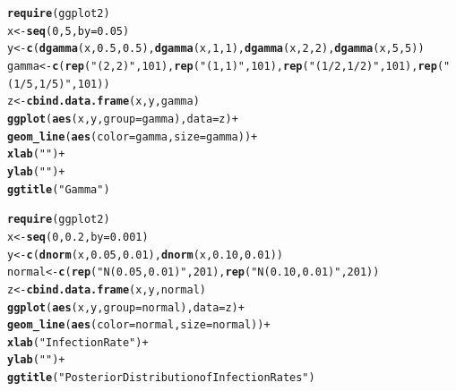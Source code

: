 \documentclass[12pt]{article}\usepackage[]{graphicx}\usepackage[]{color}
\makeatletter
\newcommand{\hlnum}[1]{\textcolor[rgb]{0.686,0.059,0.569}{#1}}%
\newcommand{\hlstr}[1]{\textcolor[rgb]{0.192,0.494,0.8}{#1}}%
\newcommand{\hlopt}[1]{\textcolor[rgb]{0,0,0}{#1}}%
\newcommand{\hlstd}[1]{\textcolor[rgb]{0.345,0.345,0.345}{#1}}%
\newcommand{\hlkwb}[1]{\textcolor[rgb]{0.69,0.353,0.396}{#1}}%
\newcommand{\hlkwc}[1]{\textcolor[rgb]{0.333,0.667,0.333}{#1}}%
\newcommand{\hlkwd}[1]{\textcolor[rgb]{0.737,0.353,0.396}{\textbf{#1}}}%
\newenvironment{kframe}{%
 \def\at@end@of@kframe{}%
 \ifinner\ifhmode%
  \def\at@end@of@kframe{\end{minipage}}%
  \begin{minipage}{\columnwidth}%
 \fi\fi%
 \def\FrameCommand##1{\hskip\@totalleftmargin \hskip-\fboxsep
 \colorbox{shadecolor}{##1}\hskip-\fboxsep
     \hskip-\linewidth \hskip-\@totalleftmargin \hskip\columnwidth}%
 \MakeFramed {\advance\hsize-\width
   \@totalleftmargin\z@ \linewidth\hsize
   \@setminipage}}%
 {\par\unskip\endMakeFramed%
 \at@end@of@kframe}
\newenvironment{knitrout}{}{} %
\makeatother
\begin{document}
\begin{knitrout}\footnotesize
{}\color{fgcolor}\begin{kframe}
\begin{alltt}
\hlkwd{require}\hlstd{(ggplot2)}
\hlstd{x} \hlkwb{<-} \hlkwd{seq}\hlstd{(}\hlnum{0}\hlstd{,}\hlnum{5}\hlstd{,} \hlkwc{by}\hlstd{=}\hlnum{0.05}\hlstd{)}
\hlstd{y} \hlkwb{<-} \hlkwd{c}\hlstd{(}\hlkwd{dgamma}\hlstd{(x,}\hlnum{0.5}\hlstd{,}\hlnum{0.5}\hlstd{),} \hlkwd{dgamma}\hlstd{(x,}\hlnum{1}\hlstd{,}\hlnum{1}\hlstd{),} \hlkwd{dgamma}\hlstd{(x,}\hlnum{2}\hlstd{,}\hlnum{2}\hlstd{),} \hlkwd{dgamma}\hlstd{(x,}\hlnum{5}\hlstd{,}\hlnum{5}\hlstd{))}
\hlstd{gamma} \hlkwb{<-} \hlkwd{c}\hlstd{(}\hlkwd{rep}\hlstd{(}\hlstr{"(2, 2)"}\hlstd{,} \hlnum{101}\hlstd{),} \hlkwd{rep}\hlstd{(}\hlstr{"(1, 1)"}\hlstd{,} \hlnum{101}\hlstd{),} \hlkwd{rep}\hlstd{(}\hlstr{"(1/2, 1/2)"}\hlstd{,} \hlnum{101}\hlstd{),} \hlkwd{rep}\hlstd{(}\hlstr{"(1/5, 1/5)"}\hlstd{,} \hlnum{101}\hlstd{))}
\hlstd{z} \hlkwb{<-} \hlkwd{cbind.data.frame}\hlstd{(x,y, gamma)}
\hlkwd{ggplot}\hlstd{(}\hlkwd{aes}\hlstd{(x, y,} \hlkwc{group}\hlstd{=gamma),} \hlkwc{data}\hlstd{=z)} \hlopt{+}
  \hlkwd{geom_line}\hlstd{(}\hlkwd{aes}\hlstd{(}\hlkwc{color}\hlstd{=gamma,} \hlkwc{size}\hlstd{=gamma))}\hlopt{+}
  \hlkwd{xlab}\hlstd{(}\hlstr{""}\hlstd{)}\hlopt{+}
  \hlkwd{ylab}\hlstd{(}\hlstr{""}\hlstd{)}\hlopt{+}
  \hlkwd{ggtitle}\hlstd{(}\hlstr{"Gamma"}\hlstd{)}
\end{alltt}
\end{kframe}
\end{knitrout}

\begin{knitrout}\footnotesize
{}\color{fgcolor}\begin{kframe}
\begin{alltt}
\hlkwd{require}\hlstd{(ggplot2)}
\hlstd{x} \hlkwb{<-} \hlkwd{seq}\hlstd{(}\hlnum{0}\hlstd{,}\hlnum{0.2}\hlstd{,} \hlkwc{by}\hlstd{=}\hlnum{0.001}\hlstd{)}
\hlstd{y} \hlkwb{<-} \hlkwd{c}\hlstd{(}\hlkwd{dnorm}\hlstd{(x,}\hlnum{0.05}\hlstd{,}\hlnum{0.01}\hlstd{),} \hlkwd{dnorm}\hlstd{(x,} \hlnum{0.10}\hlstd{,} \hlnum{0.01}\hlstd{))}
\hlstd{normal} \hlkwb{<-} \hlkwd{c}\hlstd{(}\hlkwd{rep}\hlstd{(}\hlstr{"N(0.05, 0.01)"}\hlstd{,} \hlnum{201}\hlstd{),} \hlkwd{rep}\hlstd{(}\hlstr{"N(0.10, 0.01)"}\hlstd{,} \hlnum{201}\hlstd{))}
\hlstd{z} \hlkwb{<-} \hlkwd{cbind.data.frame}\hlstd{(x,y, normal)}
\hlkwd{ggplot}\hlstd{(}\hlkwd{aes}\hlstd{(x, y,} \hlkwc{group}\hlstd{=normal),} \hlkwc{data}\hlstd{=z)} \hlopt{+}
  \hlkwd{geom_line}\hlstd{(}\hlkwd{aes}\hlstd{(}\hlkwc{color}\hlstd{=normal,} \hlkwc{size}\hlstd{=normal))}\hlopt{+}
  \hlkwd{xlab}\hlstd{(}\hlstr{"Infection Rate"}\hlstd{)}\hlopt{+}
  \hlkwd{ylab}\hlstd{(}\hlstr{""}\hlstd{)}\hlopt{+}
  \hlkwd{ggtitle}\hlstd{(}\hlstr{"Posterior Distribution of Infection Rates"}\hlstd{)}
\end{alltt}
\end{kframe}
\end{knitrout}
\end{document}
